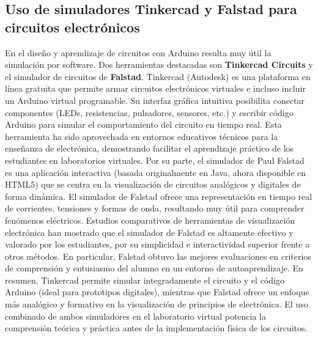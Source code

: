 \documentclass{article}
\begin{document}
\subsection{Uso de simuladores Tinkercad y Falstad para circuitos electrónicos}
En el diseño y aprendizaje de circuitos con Arduino resulta muy útil la simulación por software. Dos herramientas destacadas son \textbf{Tinkercad Circuits} y el simulador de circuitos de \textbf{Falstad}. Tinkercad (Autodesk) es una plataforma en línea gratuita que permite armar circuitos electrónicos virtuales e incluso incluir un Arduino virtual programable. Su interfaz gráfica intuitiva posibilita conectar componentes (LEDs, resistencias, pulsadores, sensores, etc.) y escribir código Arduino para simular el comportamiento del circuito en tiempo real. Esta herramienta ha sido aprovechada en entornos educativos técnicos para la enseñanza de electrónica, demostrando facilitar el aprendizaje práctico de los estudiantes en laboratorios virtuales.\cite{Jacob2021} Por su parte, el simulador de Paul Falstad es una aplicación interactiva (basada originalmente en Java, ahora disponible en HTML5) que se centra en la visualización de circuitos analógicos y digitales de forma dinámica. El simulador de Falstad ofrece una representación en tiempo real de corrientes, tensiones y formas de onda, resultando muy útil para comprender fenómenos eléctricos. Estudios comparativos de herramientas de visualización electrónica han mostrado que el simulador de Falstad es altamente efectivo y valorado por los estudiantes, por su simplicidad e interactividad superior frente a otros métodos.\cite{Verbelen2012} En particular, Falstad obtuvo las mejores evaluaciones en criterios de comprensión y entusiasmo del alumno en un entorno de autoaprendizaje.\cite{Verbelen2012} En resumen, Tinkercad permite simular integradamente el circuito y el código Arduino (ideal para prototipos digitales), mientras que Falstad ofrece un enfoque más analógico y formativo en la visualización de principios de electrónica. El uso combinado de ambos simuladores en el laboratorio virtual potencia la comprensión teórica y práctica antes de la implementación física de los circuitos.
\end{document}
